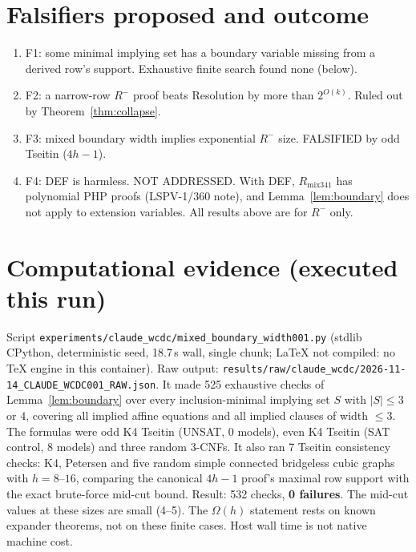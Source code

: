 \documentclass[11pt]{article}
\begin{document}
\section{Falsifiers proposed and outcome}
\begin{enumerate}
\item F1: some minimal implying set has a boundary variable missing from a derived row's support. Exhaustive finite search found none (below).
\item F2: a narrow-row $R^-$ proof beats Resolution by more than $2^{O(k)}$. Ruled out by Theorem~\ref{thm:collapse}.
\item F3: mixed boundary width implies exponential $R^-$ size. FALSIFIED by odd Tseitin ($4h-1$).
\item F4: DEF is harmless. NOT ADDRESSED. With DEF, $R_{\mathrm{mix341}}$ has polynomial PHP proofs (LSPV-1/360 note), and Lemma~\ref{lem:boundary} does not apply to extension variables. All results above are for $R^-$ only.
\end{enumerate}

\section{Computational evidence (executed this run)}
Script \texttt{experiments/claude\_wcdc/mixed\_boundary\_width001.py} (stdlib CPython, deterministic seed, 18.7\,s wall, single chunk; LaTeX not compiled: no TeX engine in this container). Raw output: \texttt{results/raw/claude\_wcdc/2026-11-14\_CLAUDE\_WCDC001\_RAW.json}.
It made 525 exhaustive checks of Lemma~\ref{lem:boundary} over every inclusion-minimal implying set $S$ with $|S|\le3$ or $4$, covering all implied affine equations and all implied clauses of width $\le3$. The formulas were odd K4 Tseitin (UNSAT, 0 models), even K4 Tseitin (SAT control, 8 models) and three random 3-CNFs. It also ran 7 Tseitin consistency checks: K4, Petersen and five random simple connected bridgeless cubic graphs with $h=8$--$16$, comparing the canonical $4h-1$ proof's maximal row support with the exact brute-force mid-cut bound. Result: 532 checks, \textbf{0 failures}. The mid-cut values at these sizes are small (4--5). The $\Omega(h)$ statement rests on known expander theorems, not on these finite cases. Host wall time is not native machine cost.
\end{document}
